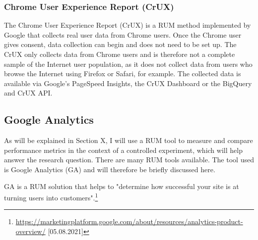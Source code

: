 


\subsubsection{Chrome User Experience Report (CrUX)} %

The Chrome User Experience Report (CrUX) is a RUM method implemented by Google that collects real user data from Chrome users.
Once the Chrome user gives consent, data collection can begin and does not need to be set up.
The CrUX only collects data from Chrome users and is therefore not a complete sample of the Internet user population, as it does not collect data from users who browse the Internet using Firefox or Safari, for example.
The collected data is available via Google's PageSpeed Insights, the CrUX Dashboard or the BigQuery and CrUX API. %







\subsection{Google Analytics} %
\label{subsection:google_analytics}


As will be explained in Section X, I will use a RUM tool to measure and compare performance metrics in the context of a controlled experiment, which will help answer the research question.
There are many RUM tools available. 
The tool used is Google Analytics (GA) and will therefore be briefly discussed here.


GA is a RUM solution that helps to "determine how successful your site is at turning users into customers".\footnote{\url{https://marketingplatform.google.com/about/resources/analytics-product-overview/} [05.08.2021]}

